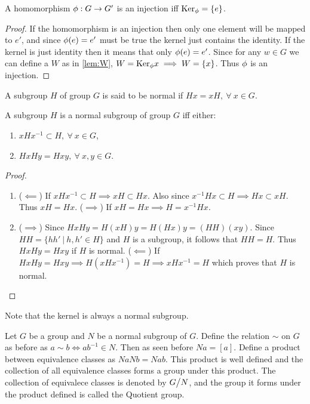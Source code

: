 \begin{corollary}
  A homomorphism $\phi:G\to G'$ is an injection iff $\text{Ker}_\phi = \{e\}$.
\end{corollary}
\begin{proof}
  If the homomorphism is an injection then only one element will be mapped to $e'$, and since $\phi(e) = e'$ must be true the kernel just contains the identity. If the kernel is just identity then it means that only $\phi(e) = e'$. Since for any $w\in G$ we can define a $W$ as in \cref{lem:W}, $W = \text{Ker}_\phi x \implies W = \{x\}$. Thus $\phi$ is an injection.
\end{proof}
\begin{definition}
  A subgroup $H$ of group $G$ is said to be normal if $Hx = xH,\ \forall\ x\in G$.
\end{definition}
\begin{proposition}\label{pro:normal}
  A subgroup $H$ is a normal subgroup of group $G$ iff either:
  \begin{enumerate}
    \item $xHx^{-1} \subset H,\ \forall\ x\in G$,
    \item $HxHy = Hxy,\ \forall\ x,y\in G$.
  \end{enumerate}
\end{proposition}
\begin{proof}
  \begin{enumerate}
    \item  ($\impliedby$) If $xHx^{-1} \subset H\implies xH \subset Hx$. Also since $x^{-1}Hx \subset H \implies Hx \subset xH$. Thus $xH = Hx$. ($\implies$) If $xH = Hx \implies H = x^{-1} H x$.
    \item ($\implies$) Since $HxHy = H(xH)y = H(Hx)y = (HH)(xy)$. Since $HH = \{hh'\ |\ h,h' \in H\}$ and $H$ is a subgroup, it follows that $HH = H$. Thus $HxHy = Hxy$ if $H$ is normal. ($\impliedby$) If $HxHy = Hxy \implies H(xHx^{-1}) = H \implies xHx^{-1} = H$ which proves that $H$ is normal.
  \end{enumerate}
\end{proof}
\begin{remark}
  Note that the kernel is always a normal subgroup.
\end{remark}
\begin{proposition}\label{pro:quotient}
  Let $G$ be a group and $N$ be a normal subgroup of $G$. Define the relation $\sim$ on $G$ as before as $a\sim b \iff ab^{-1} \in N$. Then as seen before $Na = [a]$. Define a product between equivalence classes as $NaNb = Nab$. This product is well defined and the collection of all equivalence classes forms a group under this product. The collection of equivalece classes is denoted by $G\bign/N$, and the group it forms under the product defined is called the Quotient group.
\end{proposition}
